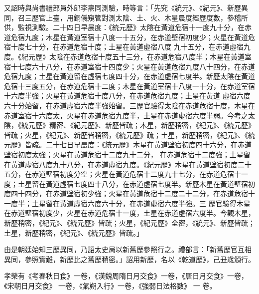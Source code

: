 \begin{pinyinscope}
 又詔時與尚書禮部員外郎李燾同測驗，時等言：「先究《統元》、《紀元》、新歷異同，召三歷官上臺，用銅儀窺管對測太陰、土、火、木星晨度經歷度數，參稽所供，監視測驗。二十四日早晨度：《統元歷》太陰在黃道危宿十一度九十分，在赤道危宿九度；木星在黃道室宿十八度一十五分，在赤道壁宿初度少；火星在黃道危宿十度七十分，在赤道危宿十度；土星在黃道虛宿八度
 九十五分，在赤道虛宿九度。《紀元歷》太陰在赤道危宿十度五十三分，在赤道危宿八度半；木星在黃道室宿十七度六十八分，在赤道室宿十四度少；火星在黃道危宿九度八十四分，在赤道危宿九度；土星在黃道留在虛宿七度四十分，在赤道虛宿七度半。新歷太陰在黃道危宿十三度五分，在赤道危宿十二度；木星在黃道室宿十八度一十分，在赤道室宿十六度半強；火星在黃道危宿十度八分，在赤道危宿九度；土星在黃道
 虛宿六度六十分始留，在赤道虛宿六度半強始留。三歷官驗得太陰在赤道危宿十度，木星在赤道室宿十六度太，火星在赤道危宿九度半，土星在赤道虛宿六度半弱。今考之太陰，《統元歷》精密、《紀元歷》、新歷皆疏；木星，新歷稍密，《紀元》、《統元歷》皆疏；火星，《紀元》、新歷皆稍密，《統元歷》疏；土星，新歷稍密，《紀元》、《統元歷》皆疏。二十七日早晨度：《統元歷》木星在黃道壁宿初度四十六分，在赤道壁宿初度太強；火星在黃道危宿十二度九十二分，
 在赤道危宿十二度強；土星留在黃道虛宿八度九十八分，在赤道虛宿九度。《紀元歷》木星在黃道壁宿初度二十五分，在赤道壁宿初度分空；火星在黃道危宿十二度九十七分，在赤道危宿十一度；土星留在黃道虛宿七度四十八分，在赤道虛宿七度半。新歷木星在黃道壁宿初度四十四分，在赤道壁宿初少強；火星在黃道危宿十二度二十二分，在赤道危宿十一度半；土星留在黃道虛宿六度六十分，在赤道虛宿六度半強。三
 歷官驗得木星在赤道壁宿初度少，火星在赤道危宿十一度，土星在赤道虛宿六度半。今觀木星，新歷稍密，《紀元》、《統元歷》皆疏；火星，《紀元歷》全密，《統元》、新歷皆疏；土星，新歷稍密，《紀元》、《統元歷》皆疏。」



 由是朝廷始知三歷異同，乃詔太史局以新舊歷參照行之。禮部言：「新舊歷官互相異同，參照實難，新歷比之舊歷稍密。」詔用新歷，名以《乾道歷》，己丑歲頒行。



 孝榮有《考春秋日食》一卷，《漢魏周隋日月交食》一卷，《唐日月交食》一卷，《宋朝日月交食》
 一卷，《氣朔入行》一卷，《強弱日法格數》
 一
 卷。



\end{pinyinscope}